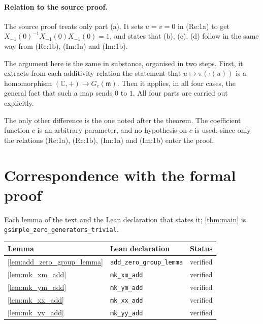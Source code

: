 \documentclass[11pt]{article}
\theoremstyle{definition}
\theoremstyle{remark}
\newcommand{\Gc}{G_c(\mathfrak{m})}
\begin{document}
\paragraph{Relation to the source proof.}
The source proof treats only part (a). It sets $u=v=0$ in (Re:1a) to get $X_{-1}(0)^{-1}X_{-1}(0)X_{-1}(0)=1$, and states that (b), (c), (d) follow in the same way from (Re:1b), (Im:1a) and (Im:1b).

The argument here is the same in substance, organised in two steps. First, it extracts from each additivity relation the statement that $u\mapsto\pi(\cdot(u))$ is a homomorphism $(\mathbb{C},+)\to\Gc$. Then it applies, in all four cases, the general fact that such a map sends $0$ to $1$. All four parts are carried out explicitly.

The only other difference is the one noted after the theorem. The coefficient function $c$ is an arbitrary parameter, and no hypothesis on $c$ is used, since only the relations (Re:1a), (Re:1b), (Im:1a) and (Im:1b) enter the proof.

\appendix
\section{Correspondence with the formal proof}
Each lemma of the text and the Lean declaration that states it; \cref{thm:main} is \texttt{gsimple\_zero\_generators\_trivial}.

\begin{longtable}{@{}lll@{}}
\toprule
Lemma & Lean declaration & Status \\
\midrule
\endhead
\cref{lem:add_zero_group_lemma} & \texttt{add\_zero\_group\_lemma} & verified \\
\cref{lem:mk_xm_add} & \texttt{mk\_xm\_add} & verified \\
\cref{lem:mk_ym_add} & \texttt{mk\_ym\_add} & verified \\
\cref{lem:mk_xx_add} & \texttt{mk\_xx\_add} & verified \\
\cref{lem:mk_yy_add} & \texttt{mk\_yy\_add} & verified \\
\bottomrule
\end{longtable}
\end{document}
